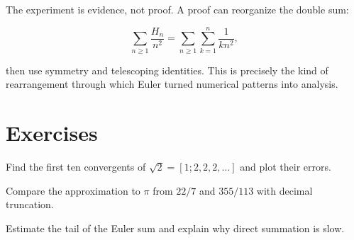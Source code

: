 The experiment is evidence, not proof. A proof can reorganize the double sum:

\[
\sum_{n\geq1}\frac{H_n}{n^2}
=\sum_{n\geq1}\sum_{k=1}^{n}\frac{1}{k n^2},
\]

then use symmetry and telescoping identities. This is precisely the kind of
rearrangement through which Euler turned numerical patterns into analysis.

\section{Exercises}
\begin{exercise}
Find the first ten convergents of $\sqrt2=[1;2,2,2,\ldots]$ and plot their errors.
\end{exercise}
\begin{exercise}
Compare the approximation to $\pi$ from $22/7$ and $355/113$ with decimal truncation.
\end{exercise}
\begin{exercise}
Estimate the tail of the Euler sum and explain why direct summation is slow.
\end{exercise}
